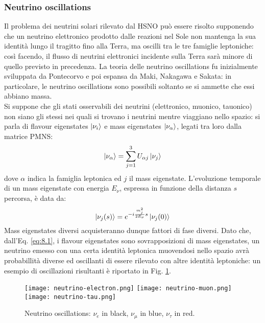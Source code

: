 \subsubsection{Neutrino oscillations}

Il problema dei neutrini solari rilevato dal HSNO può essere risolto supponendo che un neutrino elettronico prodotto dalle reazioni nel Sole non mantenga la sua identità lungo il tragitto fino alla Terra, ma oscilli tra le tre famiglie leptoniche: così facendo, il flusso di neutrini elettronici incidente sulla Terra sarà minore di quello previsto in precedenza. La teoria delle neutrino oscillations fu inizialmente sviluppata da Pontecorvo e poi espansa da Maki, Nakagawa e Sakata: in particolare, le neutrino oscillations sono possibili soltanto se si ammette che essi abbiano massa.\\
Si suppone che gli stati osservabili dei neutrini (elettronico, muonico, tauonico) non siano gli stessi nei quali si trovano i neutrini mentre viaggiano nello spazio: si parla di flavour eigenstates $ \ket{\nu_i} $ e mass eigenstates $ \ket{\nu_{\alpha}} $, legati tra loro dalla matrice PMNS:
\begin{equation}
	\ket{\nu_{\alpha}} = \sum_{j = 1}^3 U_{\alpha j} \ket{\nu_j}
	\label{eq:8.1}
\end{equation}
dove $ \alpha $ indica la famiglia leptonica ed $ j $ il mass eigenstate. L'evoluzione temporale di un mass eigenstate con energia $ E_{\nu} $, espressa in funzione della distanza $ s $ percorsa, è data da:
\begin{equation}
	\ket{\nu_j(s)} = e^{-i \frac{m_j^2}{2E_{\nu}} s} \ket{\nu_j(0)}
	\label{eq:8.2}
\end{equation}
Mass eigenstates diversi acquisteranno dunque fattori di fase diversi. Dato che, dall'Eq. \ref{eq:8.1}, i flavour eigenstates sono sovrapposizioni di mass eigenstates, un neutrino emesso con una certa identità leptonica muovendosi nello spazio avrà probabillità diverse ed oscillanti di essere rilevato con altre identità leptoniche: un esempio di oscillazioni risultanti è riportato in Fig. \ref{neutrino-oscillations}.

\begin{figure}
	\centering
	\texttt{[image: neutrino-electron.png]}
	\texttt{[image: neutrino-muon.png]}
	\texttt{[image: neutrino-tau.png]}
	\caption{Neutrino oscillations: $ \nu_e $ in black, $ \nu_{\mu} $ in blue, $ \nu_{\tau} $ in red.}
	\label{neutrino-oscillations}
\end{figure}

